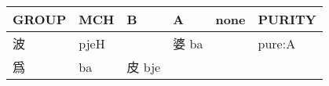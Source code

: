 \documentclass[14pt,a4paper]{scrartcl}
\begin{document}
\begin{longtable}[c]{@{}llllll@{}}
\toprule
\begin{minipage}[b]{0.14\columnwidth}\raggedright\strut
GROUP
\strut\end{minipage} &
\begin{minipage}[b]{0.14\columnwidth}\raggedright\strut
MCH
\strut\end{minipage} &
\begin{minipage}[b]{0.14\columnwidth}\raggedright\strut
B
\strut\end{minipage} &
\begin{minipage}[b]{0.14\columnwidth}\raggedright\strut
A
\strut\end{minipage} &
\begin{minipage}[b]{0.14\columnwidth}\raggedright\strut
none
\strut\end{minipage} &
\begin{minipage}[b]{0.14\columnwidth}\raggedright\strut
PURITY
\strut\end{minipage}\tabularnewline
\midrule
\endhead
\begin{minipage}[t]{0.14\columnwidth}\raggedright\strut
波
\strut\end{minipage} &
\begin{minipage}[t]{0.14\columnwidth}\raggedright\strut
pjeH
\strut\end{minipage} &
\begin{minipage}[t]{0.14\columnwidth}\raggedright\strut
\strut\end{minipage} &
\begin{minipage}[t]{0.14\columnwidth}\raggedright\strut
婆 ba
\strut\end{minipage} &
\begin{minipage}[t]{0.14\columnwidth}\raggedright\strut
\strut\end{minipage} &
\begin{minipage}[t]{0.14\columnwidth}\raggedright\strut
pure:A
\strut\end{minipage}\tabularnewline
\begin{minipage}[t]{0.14\columnwidth}\raggedright\strut
爲
\strut\end{minipage} &
\begin{minipage}[t]{0.14\columnwidth}\raggedright\strut
ba
\strut\end{minipage} &
\begin{minipage}[t]{0.14\columnwidth}\raggedright\strut
皮 bje
\strut\end{minipage} &
\begin{minipage}[t]{0.14\columnwidth}\raggedright\strut

\end{minipage}
\end{longtable}
\end{document}
